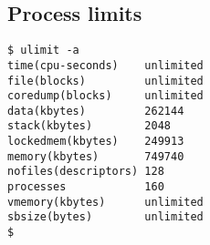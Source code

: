 \documentclass[xga]{xdvislides}
\begin{document}
%
%
%
%
%
%

\subsection{Process limits}
\begin{verbatim}
$ ulimit -a
time(cpu-seconds)    unlimited
file(blocks)         unlimited
coredump(blocks)     unlimited
data(kbytes)         262144
stack(kbytes)        2048
lockedmem(kbytes)    249913
memory(kbytes)       749740
nofiles(descriptors) 128
processes            160
vmemory(kbytes)      unlimited
sbsize(bytes)        unlimited
$
\end{verbatim}
\end{document}

